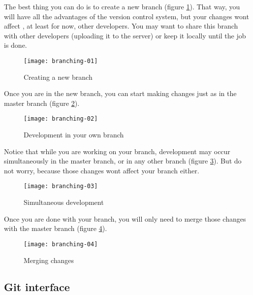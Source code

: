 \documentclass[a4paper,10pt]{article}
\begin{document}
The best thing you can do is to create a new branch (figure
\ref{create-new-branch}). That way, you will have all the advantages of the
version control system, but your changes wont affect , at least for now, other
developers. You may want to share this branch with other developers (uploading
it to the server) or keep it locally until the job is done.

\begin{figure}
  \begin{center}
    \texttt{[image: branching-01]}
  \end{center}
  \caption{Creating a new branch}
  \label{create-new-branch}
\end{figure}

Once you are in the new branch, you can start making changes just as in
the master branch (figure \ref{development-in-your-own-branch}).

\begin{figure}
  \begin{center}
    \texttt{[image: branching-02]}
  \end{center}
  \caption{Development in your own branch}
  \label{development-in-your-own-branch}
\end{figure}

Notice that while you are working on your branch, development may occur
simultaneously in the master branch, or in any other branch (figure
\ref{simultaneous-development}). But do not worry, because those changes wont
affect your branch either.

\begin{figure}
  \begin{center}
    \texttt{[image: branching-03]}
  \end{center}
  \caption{Simultaneous development}
  \label{simultaneous-development}
\end{figure}

Once you are done with your branch, you will only need to merge those
changes with the master branch (figure \ref{merging-changes}).

\begin{figure}
  \begin{center}
    \texttt{[image: branching-04]}
  \end{center}
  \caption{Merging changes}
  \label{merging-changes}
\end{figure}

\subsection{Git interface}
\end{document}
